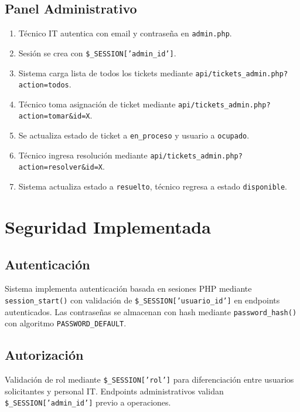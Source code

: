 \documentclass[12pt,a4paper]{article}
\begin{document}
\subsection{Panel Administrativo}

\begin{enumerate}
    \item Técnico IT autentica con email y contraseña en \texttt{admin.php}.
    \item Sesión se crea con \texttt{\$\_SESSION['admin\_id']}.
    \item Sistema carga lista de todos los tickets mediante \texttt{api/tickets\_admin.php?action=todos}.
    \item Técnico toma asignación de ticket mediante \texttt{api/tickets\_admin.php?action=tomar\&id=X}.
    \item Se actualiza estado de ticket a \texttt{en\_proceso} y usuario a \texttt{ocupado}.
    \item Técnico ingresa resolución mediante \texttt{api/tickets\_admin.php?action=resolver\&id=X}.
    \item Sistema actualiza estado a \texttt{resuelto}, técnico regresa a estado \texttt{disponible}.
\end{enumerate}

\newpage

\section{Seguridad Implementada}

\subsection{Autenticación}

Sistema implementa autenticación basada en sesiones PHP mediante \texttt{session\_start()} con validación de \texttt{\$\_SESSION['usuario\_id']} en endpoints autenticados. Las contraseñas se almacenan con hash mediante \texttt{password\_hash()} con algoritmo \texttt{PASSWORD\_DEFAULT}.

\subsection{Autorización}

Validación de rol mediante \texttt{\$\_SESSION['rol']} para diferenciación entre usuarios solicitantes y personal IT. Endpoints administrativos validan \texttt{\$\_SESSION['admin\_id']} previo a operaciones.
\end{document}
